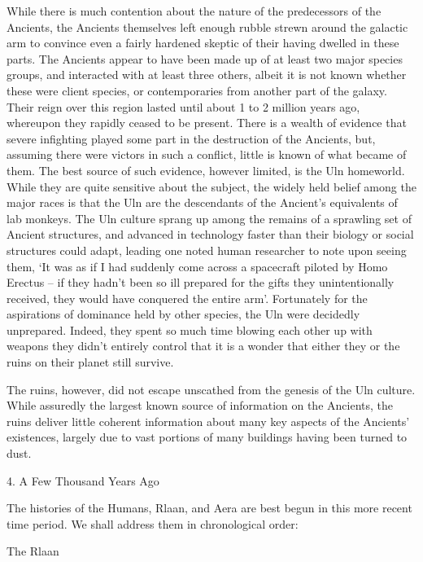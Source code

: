While there is much contention about the nature of the predecessors of the Ancients, the Ancients themselves left enough rubble strewn around the galactic arm to convince even a fairly hardened skeptic of their having dwelled in these parts. The Ancients appear to have been made up of at least two major species groups, and interacted with at least three others, albeit it is not known whether these were client species, or contemporaries from another part of the galaxy. Their reign over this region lasted until about 1 to 2 million years ago, whereupon they rapidly ceased to be present. There is a wealth of evidence that severe infighting played some part in the destruction of the Ancients, but, assuming there were victors in such a conflict, little is known of what became of them. The best source of such evidence, however limited, is the Uln homeworld. While they are quite sensitive about the subject, the widely held belief among the major races is that the Uln are the descendants of the Ancient’s equivalents of lab monkeys. The Uln culture sprang up among the remains of a sprawling set of Ancient structures, and advanced in technology faster than their biology or social structures could adapt, leading one noted human researcher to note upon seeing them, ‘It was as if I had suddenly come across a spacecraft piloted by Homo Erectus – if they hadn’t been so ill prepared for the gifts they unintentionally received, they would have conquered the entire arm’. Fortunately for the aspirations of dominance held by other species, the Uln were decidedly unprepared. Indeed, they spent so much time blowing each other up with weapons they didn’t entirely control that it is a wonder that either they or the ruins on their planet still survive.

The ruins, however, did not escape unscathed from the genesis of the Uln culture. While assuredly the largest known source of information on the Ancients, the ruins deliver little coherent information about many key aspects of the Ancients’ existences, largely due to vast portions of many buildings having been turned to dust.

4. A Few Thousand Years Ago

The histories of the Humans, Rlaan, and Aera are best begun in this more recent time period. We shall address them in chronological order:

The Rlaan

